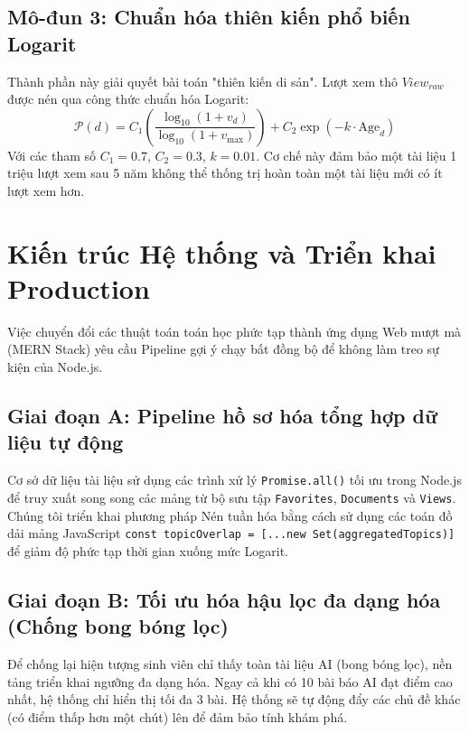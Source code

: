 \documentclass[journal]{IEEEtran}
\begin{document}
\subsection{Mô-đun 3: Chuẩn hóa thiên kiến phổ biến Logarit}

Thành phần này giải quyết bài toán "thiên kiến di sản". Lượt xem thô $View_{raw}$ được nén qua công thức chuẩn hóa Logarit:
\begin{equation}
\label{eq:pop}
\mathcal{P}(d) = C_1 \left( \frac{\log_{10}(1 + v_d)}{\log_{10}(1 + v_{\text{max}})} \right) + C_2 \exp(-k \cdot \text{Age}_{d})
\end{equation}
Với các tham số $C_1 = 0.7$, $C_2 = 0.3$, $k = 0.01$. Cơ chế này đảm bảo một tài liệu 1 triệu lượt xem sau 5 năm không thể thống trị hoàn toàn một tài liệu mới có ít lượt xem hơn.

\section{Kiến trúc Hệ thống và Triển khai Production}
\label{sec:architecture}

Việc chuyển đổi các thuật toán toán học phức tạp thành ứng dụng Web mượt mà (MERN Stack) yêu cầu Pipeline gợi ý chạy bất đồng bộ để không làm treo sự kiện của Node.js.

\subsection{Giai đoạn A: Pipeline hồ sơ hóa tổng hợp dữ liệu tự động}

Cơ sở dữ liệu tài liệu sử dụng các trình xử lý \texttt{Promise.all()} tối ưu trong Node.js để truy xuất song song các mảng từ bộ sưu tập \texttt{Favorites}, \texttt{Documents} và \texttt{Views}. Chúng tôi triển khai phương pháp Nén tuần hóa bằng cách sử dụng các toán đồ dải mảng JavaScript \texttt{const topicOverlap = [...new Set(aggregatedTopics)]} để giảm độ phức tạp thời gian xuống mức Logarit.

\subsection{Giai đoạn B: Tối ưu hóa hậu lọc đa dạng hóa (Chống bong bóng lọc)}

Để chống lại hiện tượng sinh viên chỉ thấy toàn tài liệu AI (bong bóng lọc), nền tảng triển khai ngưỡng đa dạng hóa. Ngay cả khi có 10 bài báo AI đạt điểm cao nhất, hệ thống chỉ hiển thị tối đa 3 bài. Hệ thống sẽ tự động đẩy các chủ đề khác (có điểm thấp hơn một chút) lên để đảm bảo tính khám phá.
\end{document}
